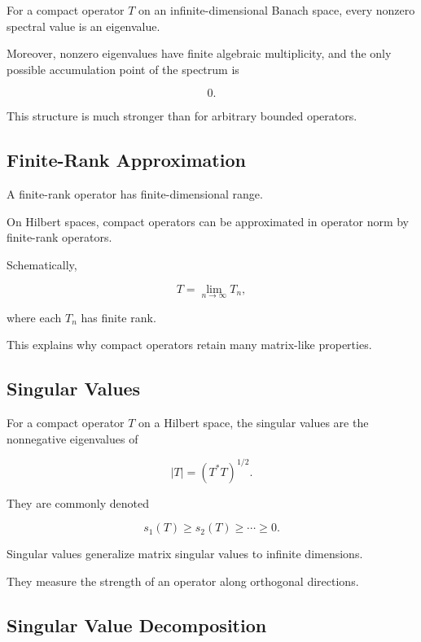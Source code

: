 For a compact operator \(T\) on an infinite-dimensional Banach space,
every nonzero spectral value is an eigenvalue.

Moreover, nonzero eigenvalues have finite algebraic multiplicity, and
the only possible accumulation point of the spectrum is

\[
\boxed{
0.
}
\]

This structure is much stronger than for arbitrary bounded operators.

\subsection{Finite-Rank Approximation}
\label{subsec:finite-rank-approximation}

A finite-rank operator has finite-dimensional range.

On Hilbert spaces, compact operators can be approximated in operator norm
by finite-rank operators.

Schematically,

\[
\boxed{
T
=
\lim_{n\to\infty}T_n,
}
\]

where each \(T_n\) has finite rank.

This explains why compact operators retain many matrix-like properties.

\subsection{Singular Values}
\label{subsec:singular-values}

For a compact operator \(T\) on a Hilbert space, the singular values are
the nonnegative eigenvalues of

\[
|T|
=
(T^*T)^{1/2}.
\]

They are commonly denoted

\[
\boxed{
s_1(T)\geq s_2(T)\geq\cdots\geq0.
}
\]

Singular values generalize matrix singular values to infinite dimensions.

They measure the strength of an operator along orthogonal directions.

\subsection{Singular Value Decomposition}
\label{subsec:operator-svd}

